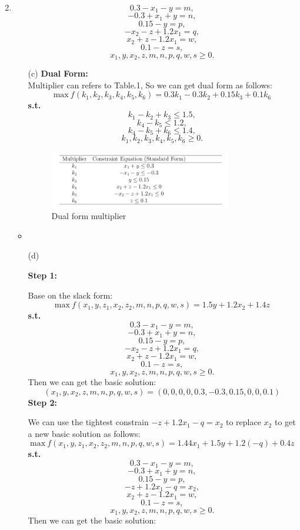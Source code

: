 \documentclass[12pt,a4paper]{article}
\makeatletter
\newtheorem*{solution}{Solution}
\theoremstyle{definition}
\renewenvironment{solution}[1][Solution] {\par\pushQED{\qed}\normalfont\topsep6\p@\@plus6\p@\relax\trivlist\item[\hskip\labelsep\bfseries#1\@addpunct{.}]\ignorespaces}{\popQED\endtrivlist\@endpefalse} \makeatother
\makeatother
\begin{document}
\begin{enumerate}
\begin{solution}
\begin{itemize}
            $$0.3-x_1-y = m,$$
            $$-0.3+x_1+y = n,$$
            $$0.15-y  = p,$$
            $$-x_2-z+1.2x_1=q,$$
            $$x_2+z-1.2x_1=w,$$
            $$0.1-z = s,$$
            $$x_1,y,x_2,z,m,n,p,q,w,s \geq 0.$$
        	\item [(c)] \textbf{Dual Form:}\\
        	Multiplier can refers to Table.1, So we can get dual form as follows:
        	$$\text{max}\ f(k_1,k_2,k_3,k_4,k_5,k_6)=0.3k_1-0.3k_2+0.15k_3+0.1k_6$$
            \textbf{s.t.}
            $$k_1-k_2+k_3 \leq 1.5,$$
            $$k_4-k_5 \leq 1.2,$$
            $$k_4-k_5+k_6 \leq 1.4,$$
            $$k_1,k_2,k_3,k_4,k_5,k_6 \geq 0.$$
            \begin{figure}[htbp]
            \centering
            \includegraphics[width=0.8\textwidth]{figures/1_1.png}
            \caption{Dual form multiplier}\label{PNG1}
            \end{figure}\item
        	\item [(d)]\par
        	\textbf{Step 1:}\par
        	Base on the slack form:
        	$$\text{max}\ f(x_1,y,z_1,x_2,z_2,m,n,p,q,w,s)=1.5y+1.2x_2+1.4z$$
            \textbf{s.t.}
            $$0.3-x_1-y = m,$$
            $$-0.3+x_1+y = n,$$
            $$0.15-y  = p,$$
            $$-x_2-z+1.2x_1=q,$$
            $$x_2+z-1.2x_1=w,$$
            $$0.1-z = s,$$
            $$x_1,y,x_2,z,m,n,p,q,w,s \geq 0.$$
            Then we can get the basic solution:
            $$(x_1,y,x_2,z,m,n,p,q,w,s)=(0,0,0,0,0.3,-0.3,0.15,0,0,0.1)$$
            \textbf{Step 2:}\par
        	We can use the tightest constrain $-z+1.2x_1-q=x_2$ to replace $x_2$ to get a new basic solution as follows:
        	$$\text{max}\ f(x_1,y,z_1,x_2,z_2,m,n,p,q,w,s)=1.44x_1+1.5y+1.2(-q)+0.4z$$
            \textbf{s.t.}
            $$0.3-x_1-y = m,$$
            $$-0.3+x_1+y = n,$$
            $$0.15-y  = p,$$
            $$-z+1.2x_1-q=x_2,$$
            $$x_2+z-1.2x_1=w,$$
            $$0.1-z = s,$$
            $$x_1,y,x_2,z,m,n,p,q,w,s \geq 0.$$
            Then we can get the basic solution:

\end{itemize}
\end{solution}
\end{enumerate}
\end{document}
